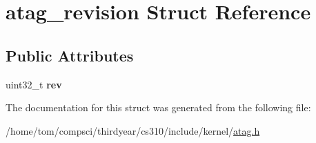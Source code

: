 \hypertarget{structatag__revision}{}\section{atag\+\_\+revision Struct Reference}
\label{structatag__revision}
\subsection*{Public Attributes}
\begin{DoxyCompactItemize}
\item 
\mbox{\label{structatag__revision_a808796e8fbff5850b3e370064e08ebf0}} 
uint32\+\_\+t {\bfseries rev}
\end{DoxyCompactItemize}


The documentation for this struct was generated from the following file\+:\begin{DoxyCompactItemize}
\item 
/home/tom/compsci/thirdyear/cs310/include/kernel/\mbox{\hyperlink{atag_8h}{atag.\+h}}\end{DoxyCompactItemize}

